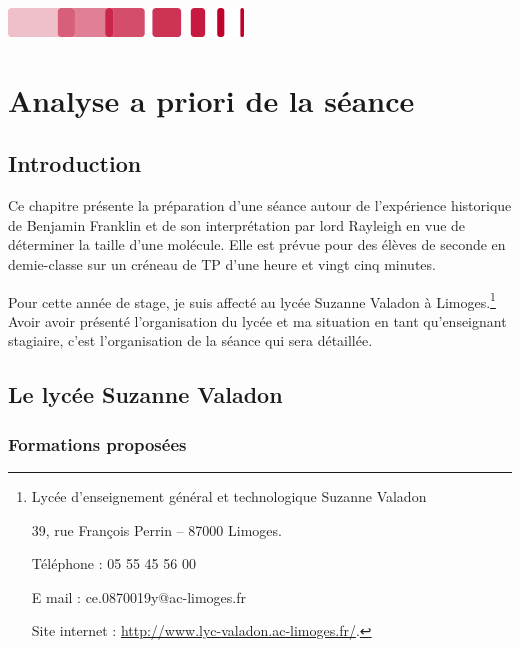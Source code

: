 \documentclass[12pt,a4paper, fleqn]{report}
\begin{document}
\vfill

\hfill
\includegraphics[scale=1]{logo_bottom.png}

\thispagestyle{empty}

\newpage

\tableofcontents
\newpage

\chapter{Analyse a priori de la séance}

\section*{Introduction}

Ce chapitre présente la préparation d'une séance autour de l'expérience historique de Benjamin Franklin et de son interprétation par lord Rayleigh en vue de déterminer la taille d'une molécule.
Elle est prévue pour des élèves de seconde en demie-classe sur un créneau de TP d'une heure et vingt cinq minutes.

Pour cette année de stage, je suis affecté au lycée Suzanne Valadon à Limoges.\footnote{Lycée d'enseignement général et technologique Suzanne Valadon

39, rue François Perrin -- 87000 Limoges.

Téléphone : 05 55 45 56 00

E mail : ce.0870019y@ac-limoges.fr

Site internet : \href{http://www.lyc-valadon.ac-limoges.fr/}{http://www.lyc-valadon.ac-limoges.fr/}.}
Avoir avoir présenté l'organisation du lycée et ma situation en tant qu'enseignant stagiaire, c'est l'organisation de la séance qui sera détaillée.

\section{Le lycée Suzanne Valadon}

\subsection{Formations proposées}
\end{document}
